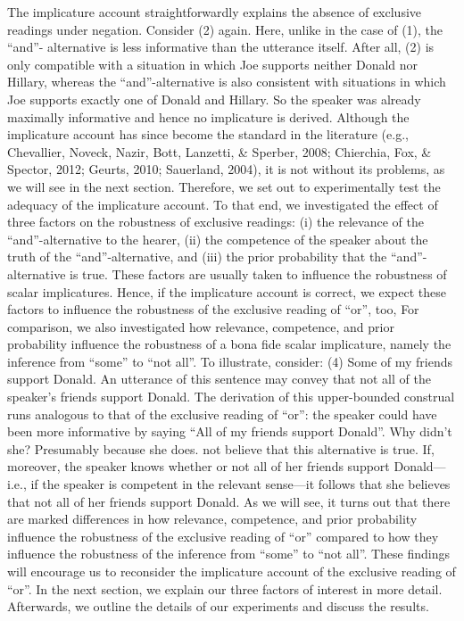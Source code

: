 \documentclass{sp}
\begin{document}
The implicature account straightforwardly explains the absence of exclusive readings
under negation. Consider (2) again. Here, unlike in the case of (1), the “and”-
alternative is less informative than the utterance itself. After all, (2) is only compatible
with a situation in which Joe supports neither Donald nor Hillary, whereas the
“and”-alternative is also consistent with situations in which Joe supports exactly one
of Donald and Hillary. So the speaker was already maximally informative and hence
no implicature is derived.
Although the implicature account has since become the standard in the literature
(e.g., Chevallier, Noveck, Nazir, Bott, Lanzetti, \& Sperber, 2008; Chierchia, Fox, \&
Spector, 2012; Geurts, 2010; Sauerland, 2004), it is not without its problems, as we
will see in the next section. Therefore, we set out to experimentally test the adequacy
of the implicature account. To that end, we investigated the effect of three factors on the
robustness of exclusive readings: (i) the relevance of the “and”-alternative to the hearer,
(ii) the competence of the speaker about the truth of the “and”-alternative, and (iii) the
prior probability that the “and”-alternative is true. These factors are usually taken to
influence the robustness of scalar implicatures. Hence, if the implicature account is
correct, we expect these factors to influence the robustness of the exclusive reading of
“or”, too, For comparison, we also investigated how relevance, competence, and prior probability
influence the robustness of a bona fide scalar implicature, namely the inference
from “some” to “not all”. To illustrate, consider:
(4) Some of my friends support Donald.
An utterance of this sentence may convey that not all of the speaker’s friends support
Donald. The derivation of this upper-bounded construal runs analogous to that of the
exclusive reading of “or”: the speaker could have been more informative by saying
“All of my friends support Donald”. Why didn’t she? Presumably because she does. not believe that this alternative is true. If, moreover, the speaker knows whether or
not all of her friends support Donald—i.e., if the speaker is competent in the relevant
sense—it follows that she believes that not all of her friends support Donald.
As we will see, it turns out that there are marked differences in how relevance,
competence, and prior probability influence the robustness of the exclusive reading of
“or” compared to how they influence the robustness of the inference from “some” to
“not all”. These findings will encourage us to reconsider the implicature account of the
exclusive reading of “or”. In the next section, we explain our three factors of interest in more detail. Afterwards, we outline the details of our experiments and discuss the results.
\end{document}
